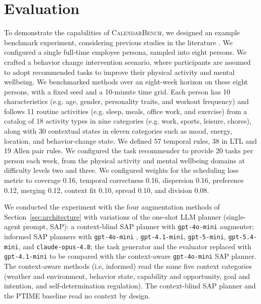 \documentclass[runningheads]{llncs}
\begin{document}
\section{Evaluation}
\label{sec:evaluation}

To demonstrate the capabilities of \textsc{CalendarBench}, we designed an example benchmark experiment, considering previous studies in the literature \citep{jorke_gptcoach_2025,shin_planfitting_2025}. We configured a single full-time employee persona, sampled into eight persons. We crafted a behavior change intervention scenario, where participants are assumed to adopt recommended tasks to improve their physical activity and mental wellbeing. We benchmarked methods over an eight-week horizon on these eight persons, with a fixed seed and a 10-minute time grid. Each person has 10 characteristics (e.g. age, gender, personality traits, and workout frequency) and follows 11 routine activities (e.g. sleep, meals, office work, and exercise) from a catalog of 18 activity types in nine categories (e.g. work, sports, leisure, chores), along with 30 contextual states in eleven categories such as mood, energy, location, and behavior-change state. We defined 57 temporal rules, 38 in LTL and 19 Allen pair rules. We configured the task recommender to provide 20 tasks per person each week, from the physical activity and mental wellbeing domains at difficulty levels two and three. We configured weights for the scheduling loss metric to coverage 0.16, temporal correctness 0.16, dispersion 0.16, preference 0.12, merging 0.12, context fit 0.10, spread 0.10, and division 0.08.


We conducted the experiment with the four augmentation methods of Section~\ref{sec:architecture} with variations of the one-shot LLM planner (single-agent prompt, SAP): a context-blind SAP planner with \texttt{gpt-4o-mini} augmenter; informed SAP planners with  \texttt{gpt-4o-mini} , \texttt{gpt-4.1-mini}, \texttt{gpt-5-mini}, \texttt{gpt-5.4-mini}, and \texttt{claude-opus-4.8}; the task generator and the evaluator replaced with \texttt{gpt-4.1-mini} to be compared with the context-aware \texttt{gpt-4o-mini} SAP planner. The context-aware methods (i.e, informed) read the same five context categories (weather and environment, behavior state, capability and opportunity, goal and intention, and self-determination regulation). The context-blind SAP planner and the PTIME baseline read no context by design. 
\end{document}
